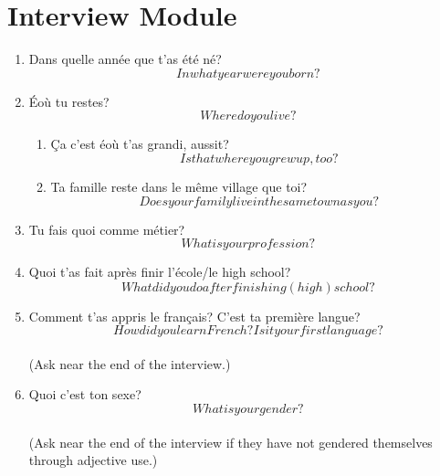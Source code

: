 
\ifdefined \longtrans
\else
  \newcommand{\longtrans}[1]{\[#1\]}
\fi
\newcommand{\setting}[1]{\textbf{#1}}

\section{Interview Module}
  \begin{enumerate}
    \subsection{Demographics}
    \item Dans quelle année que t'as été né?\\
      \longtrans{In what year were you born?}
    \item Éoù tu restes?\\
      \longtrans{Where do you live?}
    \begin{enumerate}
      \item Ça c'est éoù t'as grandi, aussit?\\
        \longtrans{Is that where you grew up, too?}
      \item Ta famille reste dans le même village que toi?\\
        \longtrans{Does your family live in the same town as you?}
    \end{enumerate}
    \item Tu fais quoi comme métier?\\
      \longtrans{What is your profession?}
    \item Quoi t'as fait après finir l'école/le high school?\\
      \longtrans{What did you do after finishing (high) school?}
    \item Comment t'as appris le français? C'est ta première langue?\\
      \longtrans{How did you learn French? Is it your first language?}\\
      (Ask near the end of the interview.)
    \item Quoi c'est ton sexe?\\
      \longtrans{What is your gender?}\\
      (Ask near the end of the interview if they have not gendered themselves through adjective use.)

\end{enumerate}
